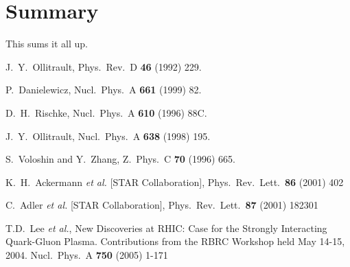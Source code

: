 \documentclass[a4paper]{book}
\numberwithin{equation}{subsection}
\begin{document}
	\chapter{Summary}
	\label{Summary}
	This sums it all up.
		
	\begin{thebibliography}{99}
	
				
				  
		J.~Y.~Ollitrault,
		Phys.\ Rev.\ D {\bf 46} (1992) 229.
				
		P.~Danielewicz,
		Nucl.\ Phys.\ A {\bf 661} (1999) 82.
				
		D.~H.~Rischke,
		Nucl.\ Phys.\ A {\bf 610} (1996) 88C.
				
		J.~Y.~Ollitrault,
		Nucl.\ Phys.\ A {\bf 638} (1998) 195.
				
		S.~Voloshin and Y.~Zhang,
		Z.\ Phys.\ C {\bf 70} (1996) 665.
				
		K.~H.~Ackermann {\it et al.}  [STAR Collaboration],
		Phys.\ Rev.\ Lett.\  {\bf 86} (2001) 402
				  
		C.~Adler {\it et al.}  [STAR Collaboration],
		Phys.\ Rev.\ Lett.\  {\bf 87} (2001) 182301  
				
		T.D.~Lee {\it et al.}, 
		New Discoveries at RHIC: Case for the Strongly Interacting 
		Quark-Gluon Plasma. 
		Contributions from the RBRC Workshop held May 14-15, 2004.
		Nucl.\ Phys.\ A {\bf 750} (2005) 1-171
				
				    
	\end{thebibliography}
\end{document}
